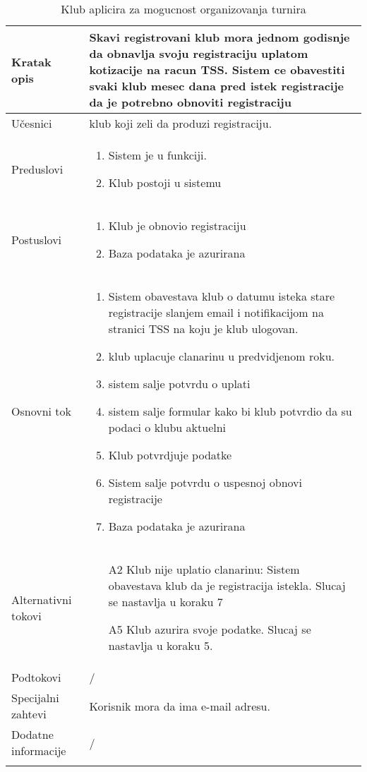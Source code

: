 \documentclass{article}
\begin{document}
\begin{longtable}{| p{} | p{} |} 
\hline
    Kratak opis & Skavi registrovani klub mora jednom godisnje da obnavlja svoju registraciju uplatom kotizacije na racun TSS. Sistem ce obavestiti svaki klub mesec dana pred istek registracije da je potrebno obnoviti registraciju\\ 
\hline    
    Učesnici & 
         klub koji zeli da produzi registraciju.
    \\
\hline
   Preduslovi & \begin{enumerate}
       \item Sistem je u funkciji.
       \item Klub postoji u sistemu
   \end{enumerate}\\
\hline  
    Postuslovi & \begin{enumerate}
        \item Klub je obnovio registraciju
        \item Baza podataka je azurirana
    \end{enumerate}\\
\hline
    Osnovni tok & \begin{enumerate}
        \item Sistem obavestava klub o datumu isteka stare registracije slanjem email i notifikacijom na stranici TSS na koju je klub ulogovan.
        \item klub uplacuje clanarinu u predvidjenom roku.
        \item sistem salje potvrdu o uplati
        \item sistem salje formular kako bi klub potvrdio da su podaci o klubu aktuelni
        \item Klub potvrdjuje podatke
        \item Sistem salje potvrdu o uspesnoj obnovi registracije
        \item Baza podataka je azurirana
    
    \end{enumerate}\\
\hline
    Alternativni tokovi & \begin{itemize}
        \item[A2] Klub nije uplatio clanarinu: Sistem obavestava klub da je registracija istekla. Slucaj se nastavlja u koraku 7
        \item[A5] Klub azurira svoje podatke. Slucaj se nastavlja u koraku 5.
    \end{itemize}\\
\hline
    Podtokovi & /\\
\hline
    Specijalni zahtevi & Korisnik mora da ima e-mail adresu.\\
\hline
    Dodatne informacije & / \\
\hline
\caption{Klub aplicira za mogucnost organizovanja turnira} %
\end{longtable}
\end{document}
